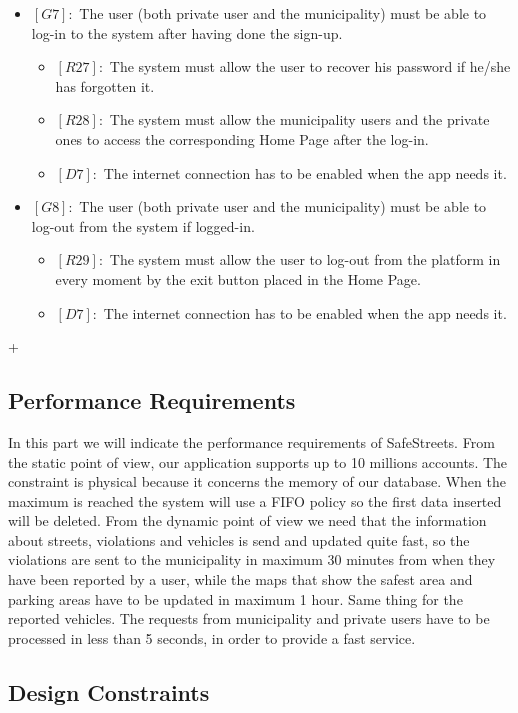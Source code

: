 \documentclass[titlepage]{article}
\begin{document}
\begin{itemize}
 
 \item $[G7]:$ The user (both private user and the municipality) must be able to log-in to the system after having done the sign-up.
 \begin{itemize}
 \item $[R27]:$ The system must allow the user to recover his password if he/she has forgotten it.
 \item $[R28]:$ The system must allow the municipality users and the private ones to access the corresponding Home Page after the log-in.
 \item $[D7]:$ The internet connection has to be enabled when the app needs it.
 \end{itemize}
 
 
 \item $[G8]:$ The user (both private user and the municipality) must be able to log-out from the system if logged-in.
 \begin{itemize}
 \item $[R29]:$ The system must allow the user to log-out from the platform in every moment by the exit button placed in the Home Page.
 \item $[D7]:$ The internet connection has to be enabled when the app needs it.
 \end{itemize}
\end{itemize}


+
\subsection{Performance Requirements}

In this part we will indicate the performance requirements of SafeStreets. From the static point of view, our application supports up to 10 millions accounts. The constraint is physical because it concerns the memory of our database. When the maximum is reached the system will use a FIFO policy so the first data inserted will be deleted.
From the dynamic point of view we need that the information about streets, violations and vehicles is send and updated quite fast, so the violations are sent to the municipality in maximum 30 minutes from when they have been reported by a user, while the maps that show the safest area and parking areas have to be updated in maximum 1 hour. Same thing for the reported vehicles.
The requests from municipality and private users have to be processed in less than 5 seconds, in order to provide a fast service.


\subsection{Design Constraints}
\end{document}
